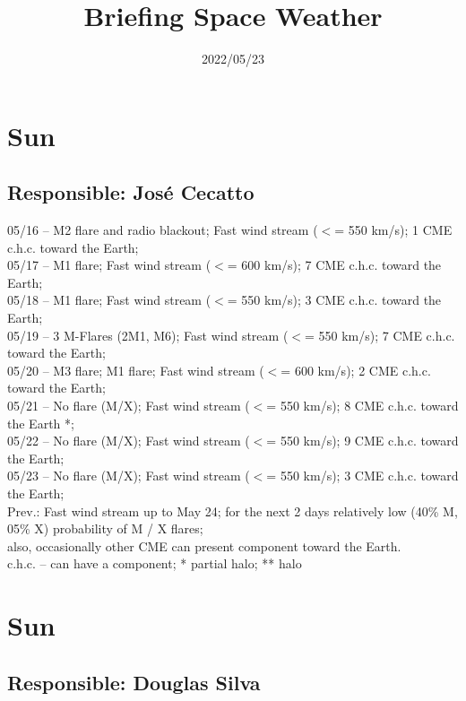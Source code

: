 \documentclass[a4paper, 10pt]{article}
\title{\Large{\textbf{Briefing Space Weather}}}
\date{2022/05/23}
\begin{document}
\maketitle 

  \thispagestyle{fancy} \section{Sun} 
 \subsection{Responsible: José Cecatto}

05/16 – M2 flare and radio blackout; Fast wind stream ($<$= 550 km/s); 1 CME c.h.c. toward the Earth; \\ 05/17 – M1 flare; Fast wind stream ($<$= 600 km/s); 7 CME c.h.c. toward the Earth; \\ 05/18 – M1 flare; Fast wind stream ($<$= 550 km/s); 3 CME c.h.c. toward the Earth; \\ 05/19 – 3 M-Flares (2M1, M6); Fast wind stream ($<$= 550 km/s); 7 CME c.h.c. toward the Earth; \\ 05/20 – M3 flare; M1 flare; Fast wind stream ($<$= 600 km/s); 2 CME c.h.c. toward the Earth; \\ 05/21 – No flare (M/X); Fast wind stream ($<$= 550 km/s); 8 CME c.h.c. toward the Earth *; \\ 05/22 – No flare (M/X); Fast wind stream ($<$= 550 km/s); 9 CME c.h.c. toward the Earth; \\ 05/23 – No flare (M/X); Fast wind stream ($<$= 550 km/s); 3 CME c.h.c. toward the Earth; \\ Prev.: Fast wind stream up to May 24; for the next 2 days relatively low (40\% M, 05\% X) probability of M / X flares; \\ also, occasionally other CME can present component toward the Earth. \\ c.h.c. – can have a component; * partial halo; ** halo\section{Sun} 
 \subsection{Responsible: Douglas Silva}
\end{document}
